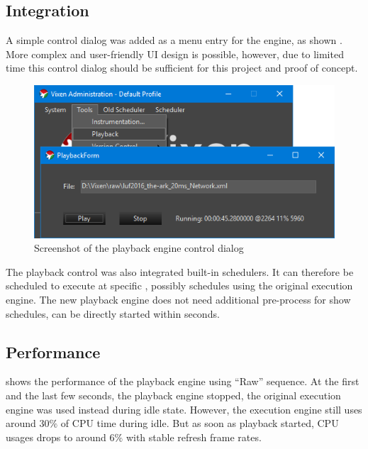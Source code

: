 \subsection{Integration}

A simple control dialog was added as a menu entry for the  engine, as shown  . More complex and user-friendly UI design is possible, however, due to limited time  this control dialog should be sufficient for this project and proof of concept.

\begin{figure}[t]
  \centering
  \includegraphics[width=0.8\columnwidth]{Figs/vixen_playback.png}
  \caption{\footnotesize Screenshot of the playback engine control dialog}
  \label{fig:vixen_playback}
\end{figure}

The playback control was also integrated  built-in schedulers. It can therefore be scheduled to execute at specific , possibly  schedules using the original execution engine. The new playback engine does not need additional pre-process for show schedules,  can be directly started within seconds.

\subsection{Performance}

 shows the performance of the  playback engine  using  ``Raw'' sequence. At the first and the last few seconds, the playback engine stopped, the original execution engine was used instead during idle state. However, the execution engine still uses around $30 \%$ of CPU time during idle. But as soon as playback started, CPU usages drops to around $6 \%$ with stable refresh frame rates.


